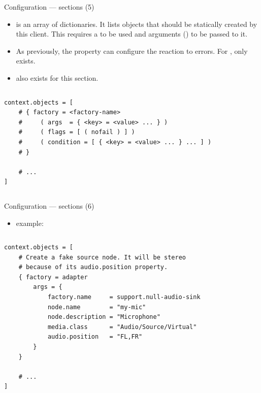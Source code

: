 \begin{frame}[fragile]{Configuration — sections (5)}

  \begin{itemize}

  \item {} is an array of dictionaries. It lists
    objects that should be statically created by this client. This
    requires a  to be used and arguments () to
    be passed to it.

  \item As previously, the  property can configure the
    reaction to errors. For , only 
    exists.

  \item {} also exists for this section.

  \end{itemize}

  \begin{columns}
    \begin{block}{}
      \fontsize{8}{8}\selectfont
        \begin{verbatim}
context.objects = [
    # { factory = <factory-name>
    #     ( args  = { <key> = <value> ... } )
    #     ( flags = [ ( nofail ) ] )
    #     ( condition = [ { <key> = <value> ... } ... ] )
    # }

    # ...
]
        \end{verbatim}
      \end{block}
  \end{columns}

\end{frame}



\begin{frame}[fragile]{Configuration — sections (6)}

  \begin{itemize}
  \item {} example:
  \end{itemize}

  \begin{columns}
    \begin{block}{}
      \fontsize{8}{8}\selectfont
        \begin{verbatim}
context.objects = [
    # Create a fake source node. It will be stereo
    # because of its audio.position property.
    { factory = adapter
        args = {
            factory.name     = support.null-audio-sink
            node.name        = "my-mic"
            node.description = "Microphone"
            media.class      = "Audio/Source/Virtual"
            audio.position   = "FL,FR"
        }
    }

    # ...
]
        \end{verbatim}
      \end{block}
  \end{columns}

\end{frame}



